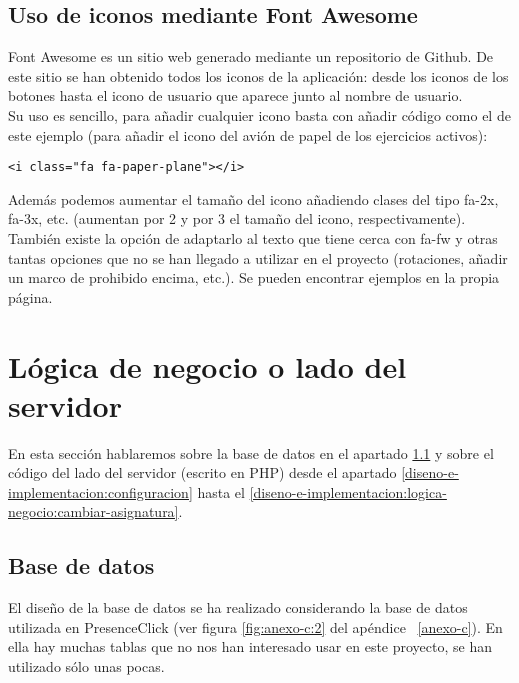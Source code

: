 \subsection{Uso de iconos mediante Font Awesome}
\label{diseno-e-implementacion:interfaces:font-awesome}

Font Awesome \hyperref[fontawesome]{\cite{fontawesome}} es un sitio web generado mediante un repositorio de Github. De este sitio se han obtenido todos los iconos de la aplicación: desde los iconos de los botones hasta el icono de usuario que aparece junto al nombre de usuario.\\

Su uso es sencillo, para añadir cualquier icono basta con añadir código como el de este ejemplo (para añadir el icono del avión de papel de los ejercicios activos):\\

\begin{lstlisting}[frame=single]
<i class="fa fa-paper-plane"></i>
\end{lstlisting}

Además podemos aumentar el tamaño del icono añadiendo clases del tipo fa-2x, fa-3x, etc. (aumentan por 2 y por 3 el tamaño del icono, respectivamente). También existe la opción de adaptarlo al texto que tiene cerca con fa-fw y otras tantas opciones que no se han llegado a utilizar en el proyecto (rotaciones, añadir un marco de prohibido encima, etc.). Se pueden encontrar ejemplos en la propia página.\\

\section{Lógica de negocio o lado del servidor}
\label{diseno-e-implementacion:logica-negocio}

En esta sección hablaremos sobre la base de datos en el apartado \ref{diseno-e-implementacion:logica-negocio:bd} y sobre el código del lado del servidor (escrito en PHP) desde el apartado \ref{diseno-e-implementacion:configuracion} hasta el \ref{diseno-e-implementacion:logica-negocio:cambiar-asignatura}.\\

\subsection{Base de datos}
\label{diseno-e-implementacion:logica-negocio:bd}

El diseño de la base de datos se ha realizado considerando la base de datos utilizada en PresenceClick (ver figura \ref{fig:anexo-c:2} del apéndice ~\ref{anexo-c}). En ella hay muchas tablas que no nos han interesado usar en este proyecto, se han utilizado sólo unas pocas.\\

